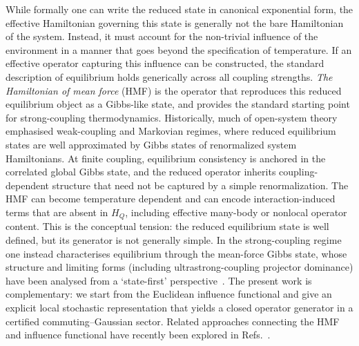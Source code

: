 \documentclass[aps,prl,twocolumn,superscriptaddress,showpacs,floatfix]{revtex4-2}
\begin{document}
While formally one can write the reduced state in canonical exponential form, the effective Hamiltonian governing this state is generally not the bare Hamiltonian of the system. Instead, it must account for the non-trivial influence of the environment in a manner that goes beyond the specification of temperature. If an effective operator capturing this influence can be constructed, the standard description of equilibrium holds generically across all coupling strengths. \emph{The Hamiltonian of mean force} (HMF) is the operator that reproduces this reduced equilibrium object as a Gibbs-like state, and provides the standard starting point for strong-coupling thermodynamics\cite{campisiFluctuationTheoremArbitrary2009,jarzynskiNonequilibriumWorkTheorem2004,jarzynskiStochasticMacroscopicThermodynamics2017,talknerColloquiumStatisticalMechanics2020,seifertFirstSecondLaw2016}. Historically, much of open-system theory emphasised weak-coupling and Markovian regimes, where reduced equilibrium states are well approximated by Gibbs states of renormalized system Hamiltonians. At finite coupling, equilibrium consistency is anchored in the correlated global Gibbs state, and the reduced operator inherits coupling-dependent structure that need not be captured by a simple renormalization. The HMF can become temperature dependent and can encode interaction-induced terms that are absent in $H_Q$, including effective many-body or nonlocal operator content\cite{talknerColloquiumStatisticalMechanics2020,seifertFirstSecondLaw2016,espositoNatureHeatStrongly2015,hanggiFiniteQuantumDissipation2008,ingoldSpecificHeatAnomalies2009,correaPotentialRenormalisationLamb2025}. This is the conceptual tension: the reduced equilibrium state is well defined, but its generator is not generally simple. In the strong-coupling regime one instead characterises equilibrium through the mean-force Gibbs state, whose structure and limiting forms (including ultrastrong-coupling projector dominance) have been analysed from a `state-first' perspective~\cite{cresserWeakUltrastrongCoupling2021a,trushechkinOpenQuantumSystem2022}. The present work is complementary: we start from the Euclidean influence functional and give an explicit local stochastic representation that yields a closed operator generator in a certified commuting--Gaussian sector. Related approaches connecting the HMF and influence functional have recently been explored in Refs.~\cite{hoggTutorialStochasticSimulation2024,hoggEnhancedEntanglement2024}. 
\end{document}
